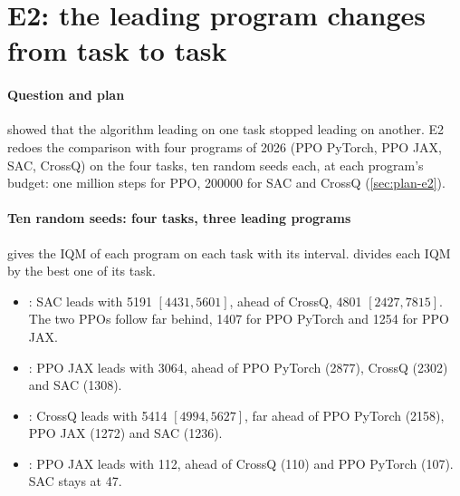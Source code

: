 \section{E2: the leading program changes from task to task}\label{sec:e2}

\paragraph{Question and plan}
\textcite{henderson2018matters} showed that the algorithm leading on one task stopped leading on another. E2
redoes the comparison with four programs of 2026 (PPO PyTorch, PPO JAX, SAC, CrossQ) on the four tasks, ten
random seeds each, at each program's budget: one million steps for PPO, \num{200000} for SAC and CrossQ
(\cref{sec:plan-e2}).

\paragraph{Ten random seeds: four tasks, three leading programs}
 gives the IQM of each program on each task with its interval. 
divides each IQM by the best one of its task.
\begin{itemize}
  \item {}: SAC leads with \num{5191} $[\num{4431}, \num{5601}]$, ahead of CrossQ, \num{4801}
    $[\num{2427}, \num{7815}]$. The two PPOs follow far behind, \num{1407} for PPO PyTorch and \num{1254} for
    PPO JAX.
  \item {}: PPO JAX leads with \num{3064}, ahead of PPO PyTorch (\num{2877}), CrossQ (\num{2302})
    and SAC (\num{1308}).
  \item {}: CrossQ leads with \num{5414} $[\num{4994}, \num{5627}]$, far ahead of PPO PyTorch
    (\num{2158}), PPO JAX (\num{1272}) and SAC (\num{1236}).
  \item {}: PPO JAX leads with 112, ahead of CrossQ (110) and PPO PyTorch (107). SAC stays at 47.
\end{itemize}


